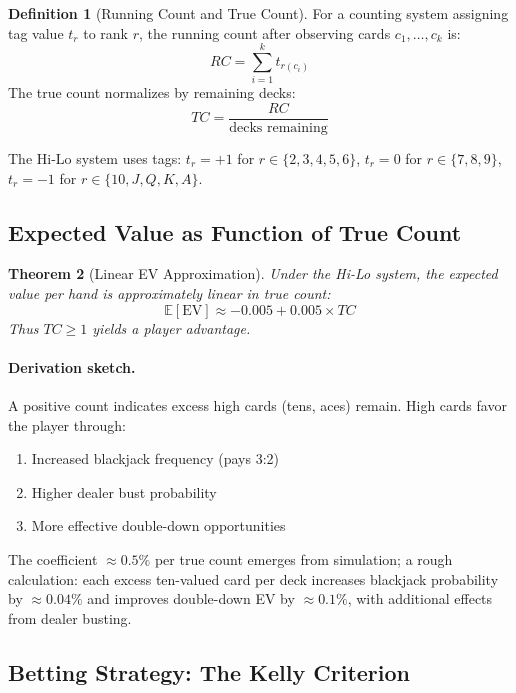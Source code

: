 \documentclass[11pt,a4paper]{article}
\newtheorem{theorem}{Theorem}[section]
\theoremstyle{definition}
\newtheorem{definition}[theorem]{Definition}
\newcommand{\E}{\mathbb{E}}
\begin{document}
\begin{definition}[Running Count and True Count]
For a counting system assigning tag value $t_r$ to rank $r$, the running count after observing cards $c_1, \ldots, c_k$ is:
\begin{equation}
RC = \sum_{i=1}^{k} t_{r(c_i)}
\end{equation}
The true count normalizes by remaining decks:
\begin{equation}
TC = \frac{RC}{\text{decks remaining}}
\end{equation}
\end{definition}

The Hi-Lo system uses tags: $t_r = +1$ for $r \in \{2,3,4,5,6\}$, $t_r = 0$ for $r \in \{7,8,9\}$, $t_r = -1$ for $r \in \{10,J,Q,K,A\}$.

\subsection{Expected Value as Function of True Count}

\begin{theorem}[Linear EV Approximation]
Under the Hi-Lo system, the expected value per hand is approximately linear in true count:
\begin{equation}
\E[\text{EV}] \approx -0.005 + 0.005 \times TC
\end{equation}
Thus $TC \geq 1$ yields a player advantage.
\end{theorem}

\paragraph{Derivation sketch.} A positive count indicates excess high cards (tens, aces) remain. High cards favor the player through:
\begin{enumerate}[nosep]
\item Increased blackjack frequency (pays 3:2)
\item Higher dealer bust probability
\item More effective double-down opportunities
\end{enumerate}

The coefficient $\approx 0.5\%$ per true count emerges from simulation; a rough calculation: each excess ten-valued card per deck increases blackjack probability by $\approx 0.04\%$ and improves double-down EV by $\approx 0.1\%$, with additional effects from dealer busting.

\subsection{Betting Strategy: The Kelly Criterion}
\end{document}
